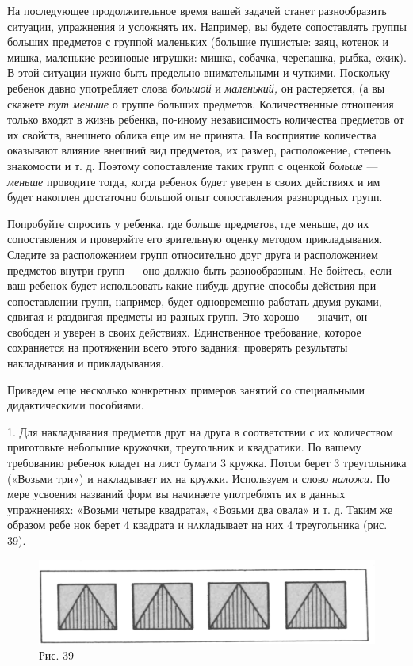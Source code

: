 \documentclass{book}
\renewcommand{\emph}[1]{\textit{#1}}
\begin{document}
На последующее продолжительное время вашей задачей станет разнообразить
ситуации, упражнения и усложнять их. Например, вы будете сопоставлять
группы больших предметов с группой маленьких (большие пушистые: заяц,
котенок и мишка, маленькие резиновые игрушки: мишка, собачка, черепашка,
рыбка, ежик). В этой ситуации нужно быть предельно внимательными и
чуткими. Поскольку ребенок давно употребляет слова \emph{большой} и
\emph{маленький,} он растеряется, (а вы скажете \emph{тут меньше} о
группе больших предметов. Количественные отношения только входят в жизнь
ребенка, по-иному независимость количества предметов от их свойств,
внешнего облика еще им не принята. На восприятие количества оказывают
влияние внешний вид предметов, их размер, расположение, степень
знакомости и т. д. Поэтому сопоставление таких групп с оценкой
\emph{больше} --- \emph{меньше} проводите тогда, когда ребенок будет
уверен в своих действиях и им будет накоплен достаточно большой опыт
сопоставления разнородных групп.

Попробуйте спросить у ребенка, где больше предметов, где меньше, до их
сопоставления и проверяйте его зрительную оценку методом прикладывания.
Следите за расположением групп относительно друг друга и расположением
предметов внутри групп --- оно должно быть разнообразным. Не бойтесь,
если ваш ребенок будет использовать какие-нибудь другие способы действия
при сопоставлении групп, например, будет одновременно работать двумя
руками, сдвигая и раздвигая предметы из разных групп. Это хорошо ---
значит, он свободен и уверен в своих действиях. Единственное требование,
которое сохраняется на протяжении всего этого задания: проверять
результаты накладывания и прикладывания.

Приведем еще несколько конкретных примеров занятий со специальными
дидактическими пособиями.

1. Для накладывания предметов друг на друга в соответствии с их
количеством приготовьте небольшие кружочки, треугольник и квадратики. По
вашему требованию ребенок кладет на лист бумаги 3 кружка. Потом берет 3
треугольника («Возьми три») и накладывает их на кружки. Используем и
слово \emph{наложи.} По мере усвоения названий форм вы начинаете
употреблять их в данных упражнениях: «Возьми четыре квадрата», «Возьми
два овала» и т. д. Таким же образом ребе нок берет 4 квадрата и
\textsc{на}кладывает на них 4 треугольника (рис. 39).

\begin{figure}
\centering
\includegraphics[width=\linewidth]{media/media/image36.png}
\caption*{Рис. 39}
\end{figure}
\end{document}
